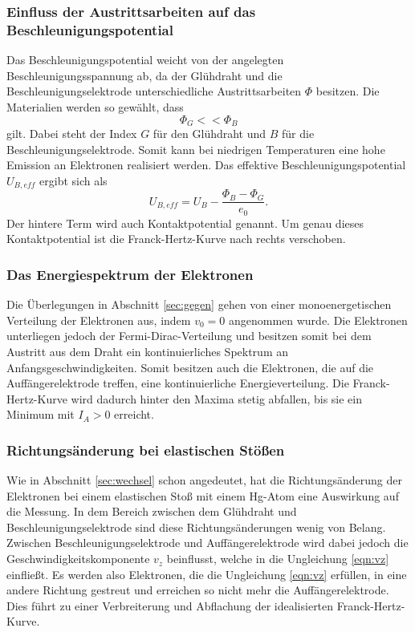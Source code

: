 \subsubsection*{Einfluss der Austrittsarbeiten auf das Beschleunigungspotential}
Das Beschleunigungspotential weicht von der angelegten Beschleunigungsspannung ab, da der Glühdraht und die Beschleunigungselektrode
unterschiedliche Austrittsarbeiten $\Phi$ besitzen. Die Materialien werden so gewählt, dass
\begin{equation*}
    \Phi_G<<\Phi_B
\end{equation*}
gilt. Dabei steht der Index $G$ für den Glühdraht und $B$ für die Beschleunigungselektrode. Somit kann bei niedrigen
Temperaturen eine hohe Emission an Elektronen realisiert werden. Das effektive Beschleunigungspotential $U_{B,eff}$ ergibt sich als
\begin{equation*}
    U_{B,eff}=U_B-\frac{\Phi_B-\Phi_G}{e_0} .
\end{equation*}
Der hintere Term wird auch Kontaktpotential genannt. Um genau dieses Kontaktpotential ist die Franck-Hertz-Kurve nach rechts verschoben.

\subsubsection*{Das Energiespektrum der Elektronen}
Die Überlegungen in Abschnitt \ref{sec:gegen} gehen von einer monoenergetischen Verteilung der Elektronen aus, indem $v_0=0$ angenommen
wurde. Die Elektronen unterliegen jedoch der Fermi-Dirac-Verteilung und besitzen somit bei dem Austritt aus dem Draht ein kontinuierliches
Spektrum an Anfangsgeschwindigkeiten. Somit besitzen auch die Elektronen, die auf die Auffängerelektrode treffen, eine kontinuierliche
Energieverteilung. Die Franck-Hertz-Kurve wird dadurch hinter den Maxima stetig abfallen, bis sie ein Minimum mit $I_A>0$ erreicht.

\subsubsection*{Richtungsänderung bei elastischen Stößen}
Wie in Abschnitt \ref{sec:wechsel} schon angedeutet, hat die Richtungsänderung der Elektronen bei einem elastischen Stoß mit einem Hg-Atom
eine Auswirkung auf die Messung. In dem Bereich zwischen dem Glühdraht und Beschleunigungselektrode sind diese Richtungsänderungen
wenig von Belang. Zwischen Beschleunigungselektrode und Auffängerelektrode wird dabei jedoch die Geschwindigkeitskomponente $v_z$ beinflusst,
welche in die Ungleichung \eqref{eqn:vz} einfließt. Es werden also Elektronen, die die Ungleichung \eqref{eqn:vz} erfüllen, in eine andere
Richtung gestreut und erreichen so nicht mehr die Auffängerelektrode. Dies führt zu einer Verbreiterung und Abflachung der idealisierten
Franck-Hertz-Kurve.

